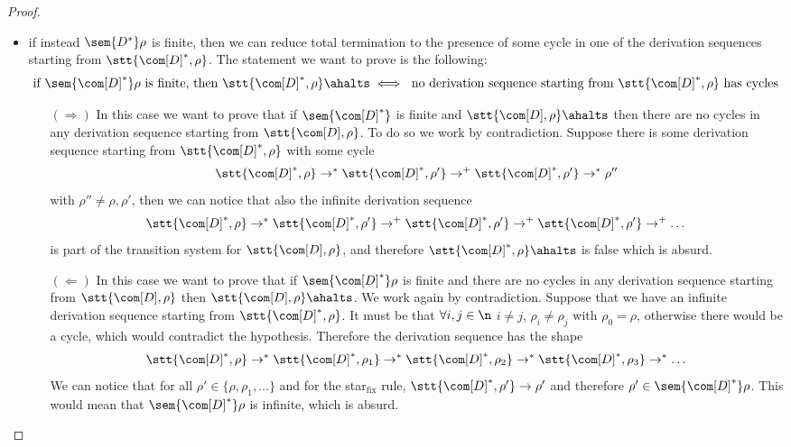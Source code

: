 \begin{proof}
\begin{itemize}
  \item if instead \(\sem{D^*}\rho\) is finite, then we can
    reduce total termination to the presence of some cycle in one of
    the derivation sequences starting from
    \(\stt{\com[D]^*, \rho}\). The statement we want to prove is the
    following:
    \begin{equation*}
      \text{if }\sem{\com[D]^*}\rho \text{ is finite, then } \stt{\com[D]^*, \rho} \ahalts \iff \text{ no derivation sequence starting from } \stt{\com[D]^*, \rho} \text{ has cycles}
    \end{equation*}
    \begin{itemize}
    \item[\((\Rightarrow)\)] In this case we want to prove that if
      \(\sem{\com[D]^*}\) is finite and
      \(\stt{\com[D], \rho} \ahalts\) then there are no cycles in
      any derivation sequence starting from \(\stt{\com[D],
        \rho}\). To do so we work by contradiction. Suppose there is
      some derivation sequence starting from
      \(\stt{\com[D]^*, \rho}\) with some cycle
      \begin{equation*}
        \stt{\com[D]^*, \rho} \to^* \stt{\com[D]^*, \rho'} \to^+ \stt{\com[D]^*, \rho'} \to^* \rho''
      \end{equation*}
      with \(\rho''\neq \rho, \rho'\), then we can notice that also
      the infinite derivation sequence
      \begin{equation*}
        \stt{\com[D]^*, \rho} \to^* \stt{\com[D]^*, \rho'} \to^+ \stt{\com[D]^*, \rho'} \to^+ \stt{\com[D]^*, \rho'} \to^+ \dots
      \end{equation*}
      is part of the transition system for \(\stt{\com[D], \rho}\),
      and therefore \(\stt{\com[D]^*, \rho} \ahalts\) is false which
      is absurd.
    \item[\((\Leftarrow)\)] In this case we want to prove that if
      \(\sem{\com[D]^*}\rho\) is finite and there are no cycles in any
      derivation sequence starting from \(\stt{\com[D], \rho}\) then
      \(\stt{\com[D], \rho} \ahalts\). We work again by
      contradiction. Suppose that we have an infinite derivation
      sequence starting from \(\stt{\com[D]^*, \rho}\). It must be
      that \(\forall i,j \in \n\) \(i \neq j\), \(\rho_i \neq \rho_j\)
      with \(\rho_0 = \rho\), otherwise there would be a cycle, which
      would contradict the hypothesis. Therefore the derivation
      sequence has the shape
      \begin{equation*}
        \stt{\com[D]^*, \rho} \to^* \stt{\com[D]^*, \rho_1} \to^* \stt{\com[D]^*, \rho_2} \to^* \stt{\com[D]^*, \rho_3} \to^* \dots
      \end{equation*}
      We can notice that for all \(\rho' \in \{\rho, \rho_1, \dots\}\)
      and for the star\(_{\text{fix}}\) rule,
      \(\stt{\com[D]^*, \rho'} \to \rho'\) and therefore
      \(\rho'\in \sem{\com[D]^*}\rho\). This would mean that
      \(\sem{\com[D]^*}\rho\) is infinite, which is absurd.
    \end{itemize}


\end{itemize}
\end{proof}

